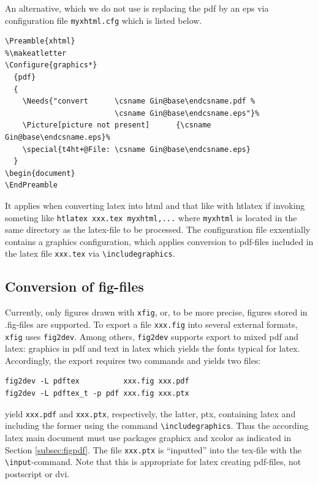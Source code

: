 \documentclass[12pt]{article}
\begin{document}
An alternative, which we do not use 
is replacing the pdf by an \gls{eps} via configuration file {\tt myxhtml.cfg} 
which is listed below. 
%
\lstset{language=tex, basicstyle=\scriptsize}
\begin{lstlisting}
\Preamble{xhtml}
%\makeatletter
\Configure{graphics*}  
  {pdf}  
  {
    \Needs{"convert      \csname Gin@base\endcsname.pdf %
                         \csname Gin@base\endcsname.eps"}%  
    \Picture[picture not present]      {\csname Gin@base\endcsname.eps}%  
    \special{t4ht+@File: \csname Gin@base\endcsname.eps}
  }
\begin{document}
\EndPreamble

\end{lstlisting}
%
It applies when converting latex into html and that like 
with htlatex if invoking someting like {\tt htlatex xxx.tex myxhtml,...} 
where {\tt myxhtml} is located in the same directory as the latex-file 
to be processed. 
The configuration file exxentially contains a graphics configuration, 
which applies conversion to pdf-files included in the latex file {\tt xxx.tex}
via {\tt \textbackslash includegraphics}. 


\subsection{Conversion of fig-files}\label{subsec:fig2dev}

Currently, only figures drawn with {\tt xfig}, or, to be more precise, 
figures stored in .fig-files are supported. 
To export a file {\tt xxx.fig} into several external formats, 
{\tt xfig} uses {\tt fig2dev}. 
Among others, {\tt fig2dev} supports export to mixed pdf and latex: 
graphics in pdf and text in latex which yields the fonts typical for latex. 
Accordingly, the export requires two commands and yields two files: 
%
\begin{verbatim}
fig2dev -L pdftex          xxx.fig xxx.pdf   
fig2dev -L pdftex_t -p pdf xxx.fig xxx.ptx
\end{verbatim}
%
yield {\tt xxx.pdf} and {\tt xxx.ptx}, respectively, 
the latter, \gls{ptx}, containing latex and including the former 
using the command {\tt\textbackslash includegraphics}. 
Thus the according latex main document must use packages graphicx and xcolor 
as indicated in Section \ref{subsec:figpdf}. 
The file {\tt xxx.ptx} is ``inputted'' into the tex-file 
with the {\tt\textbackslash input}-command. 
Note that this is appropriate for latex creating pdf-files, 
not postscript or dvi. 
\end{document}
